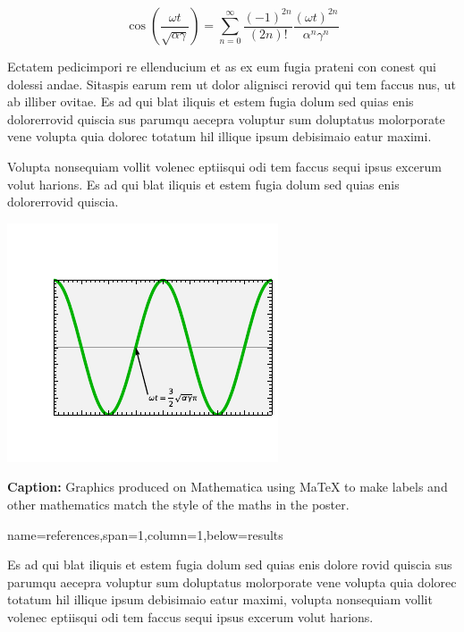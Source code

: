 \documentclass[a0paper,portrait]{baposter}
\begin{document}
\begin{poster}
{\begin{multicols}{2}
\begin{equation*}
\cos\mathopen{}\left(\frac{\omega t}{\sqrt{\alpha\gamma}}\right)\mathclose{} = \sum_{n=0}^\infty \frac{(-1)^{2n}}{(2n)!} \frac{(\omega t)^{2n}}{\alpha^{n}\gamma^{n}}
\end{equation*}



Ectatem pedicimpori re ellenducium et as ex eum fugia prateni con conest qui dolessi andae. Sitaspis earum rem ut dolor alignisci rerovid qui tem faccus nus, ut ab illiber ovitae. Es ad qui blat iliquis et estem fugia dolum sed quias enis dolorerrovid quiscia sus parumqu aecepra voluptur sum doluptatus molorporate vene volupta quia dolorec totatum hil illique ipsum debisimaio eatur maximi. 

\vfill\null
\columnbreak

Volupta nonsequiam vollit volenec eptiisqui odi tem faccus sequi ipsus excerum volut harions. Es ad qui blat iliquis et estem fugia dolum sed quias enis dolorerrovid quiscia.


\begin{center}
\includegraphics[scale=1,valign=T]{sample-figure.pdf}
\end{center}

\footnotesize \smaller
\textbf{Caption:} Graphics produced on Mathematica using MaTeX to make labels and other mathematics match the style of the maths in the poster.
\vfill\null
\end{multicols}

}

{name=references,span=1,column=1,below=results}{
Es ad qui blat iliquis et estem fugia dolum sed quias enis dolore rovid quiscia sus parumqu aecepra voluptur sum doluptatus molorporate vene volupta quia dolorec totatum hil illique ipsum debisimaio eatur maximi, volupta nonsequiam vollit volenec eptiisqui odi tem faccus sequi ipsus excerum volut harions.

}
\end{poster}
\end{document}

